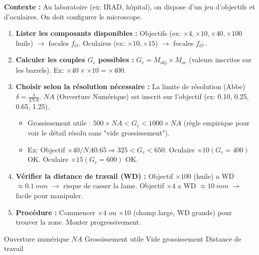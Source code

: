 \documentclass[11pt]{article}
\newcommand{\cle}[1]{{\popxbold\color{popdark}#1}}
\begin{document}
\begin{methode}
\textbf{Contexte :} Au laboratoire (ex: IRAD, hôpital), on dispose d'un jeu d'objectifs et d'oculaires. On doit configurer le microscope.
\begin{enumerate}
    \item \textbf{Lister les composants disponibles :} Objectifs (ex: $\times 4, \times 10, \times 40, \times 100$ huile) $\to$ focales $f_O$. Oculaires (ex: $\times 10, \times 15$) $\to$ focales $f_{O'}$.
    \item \textbf{Calculer les couples $G_c$ possibles :} $G_c = M_{obj} \times M_{oc}$ (valeurs inscrites sur les barrels). Ex: $\times 40 \times \times 10 = \times 400$.
    \item \textbf{Choisir selon la résolution nécessaire :} La limite de résolution (Abbe) $\delta = \frac{\lambda}{2 NA}$. $NA$ (Ouverture Numérique) est inscrit sur l'objectif (ex: 0.10, 0.25, 0.65, 1.25).
    \begin{itemize}
        \item Grossissement utile : $500 \times NA < G_c < 1000 \times NA$ (règle empirique pour voir le détail résolu sans "vide grossissement").
        \item Ex: Objectif $\times 40 / NA 0.65 \Rightarrow 325 < G_c < 650$. Oculaire $\times 10 (G_c=400)$ OK. Oculaire $\times 15 (G_c=600)$ OK.
    \end{itemize}
    \item \textbf{Vérifier la distance de travail (WD) :} Objectif $\times 100$ (huile) a WD $\approx \SI{0,1}{mm}$ $\to$ risque de casser la lame. Objectif $\times 4$ a WD $\approx \SI{10}{mm}$ $\to$ facile pour manipuler.
    \item \textbf{Procédure :} Commencer $\times 4$ ou $\times 10$ (champ large, WD grande) pour trouver la zone. Monter progressivement.
\end{enumerate}
\cle{Ouverture numérique $NA$} \cle{Grossissement utile} \cle{Vide grossissement} \cle{Distance de travail}
\end{methode}
\end{document}
